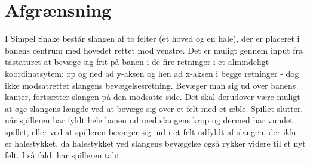 \section{Afgrænsning}
I Simpel Snake består slangen af to felter (et hoved og en hale), der er placeret i banens centrum med hovedet rettet mod venstre. Det er muligt gennem input fra tastaturet at bevæge sig frit på banen i de fire retninger i et almindeligt koordinatsytem: op og ned ad y-aksen og hen ad x-aksen i begge retninger - dog ikke modsatrettet slangens bevægelsesretning. Bevæger man sig ud over banens kanter, fortsætter slangen på den modsatte side. Det skal derudover være muligt at øge slangens længde ved at bevæge sig over et felt med et æble. Spillet slutter, når spilleren har fyldt hele banen ud med slangens krop og dermed har vundet spillet, eller ved at spilleren bevæger sig ind i et felt udfyldt af slangen, der ikke er halestykket, da halestykket ved slangens bevægelse også rykker videre til et nyt felt. I så fald, har spilleren tabt.